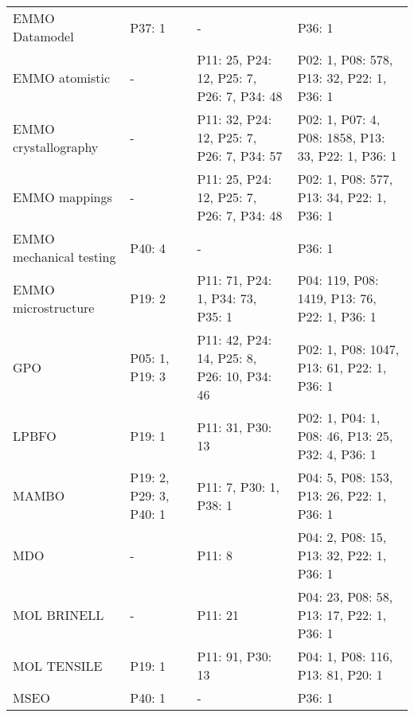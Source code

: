 \begin{table}
\begin{tabular}{m{3.5cm}m{2cm}m{2cm}m{2cm}}
         EMMO Datamodel &                  P37: 1 &                                                        - &                                                     P36: 1 \\
         EMMO atomistic &                       - &                P11: 25, P24: 12, P25: 7, P26: 7, P34: 48 &                  P02: 1, P08: 578, P13: 32, P22: 1, P36: 1 \\
   EMMO crystallography &                       - &                P11: 32, P24: 12, P25: 7, P26: 7, P34: 57 &         P02: 1, P07: 4, P08: 1858, P13: 33, P22: 1, P36: 1 \\
          EMMO mappings &                       - &                P11: 25, P24: 12, P25: 7, P26: 7, P34: 48 &                  P02: 1, P08: 577, P13: 34, P22: 1, P36: 1 \\
EMMO mechanical testing &                  P40: 4 &                                                        - &                                                     P36: 1 \\
    EMMO microstructure &                  P19: 2 &                         P11: 71, P24: 1, P34: 73, P35: 1 &               P04: 119, P08: 1419, P13: 76, P22: 1, P36: 1 \\
                    GPO &          P05: 1, P19: 3 &               P11: 42, P24: 14, P25: 8, P26: 10, P34: 46 &                 P02: 1, P08: 1047, P13: 61, P22: 1, P36: 1 \\
                  LPBFO &                  P19: 1 &                                         P11: 31, P30: 13 &           P02: 1, P04: 1, P08: 46, P13: 25, P32: 4, P36: 1 \\
                  MAMBO &  P19: 2, P29: 3, P40: 1 &                                   P11: 7, P30: 1, P38: 1 &                  P04: 5, P08: 153, P13: 26, P22: 1, P36: 1 \\
                    MDO &                       - &                                                   P11: 8 &                   P04: 2, P08: 15, P13: 32, P22: 1, P36: 1 \\
            MOL BRINELL &                       - &                                                  P11: 21 &                  P04: 23, P08: 58, P13: 17, P22: 1, P36: 1 \\
            MOL TENSILE &                  P19: 1 &                                         P11: 91, P30: 13 &                          P04: 1, P08: 116, P13: 81, P20: 1 \\
                   MSEO &                  P40: 1 &                                                        - &                                                     P36: 1 \\

\end{tabular}
\end{table}

